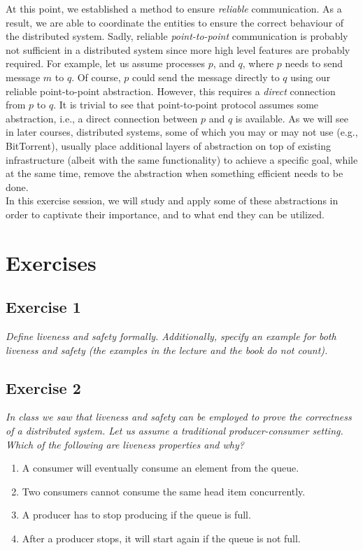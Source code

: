 At this point, we established a method to ensure \emph{reliable} communication. As a result, we are able to coordinate the entities to ensure the correct behaviour of the distributed system. Sadly, reliable \emph{point-to-point} communication is probably not sufficient in a distributed system since more high level features are probably required. For example, let us assume processes $p$, and $q$, where $p$ needs to send message $m$ to $q$. Of course, $p$ could send the message directly to $q$ using our reliable point-to-point abstraction. However, this requires a \emph{direct} connection from $p$ to $q$. It is trivial to see that point-to-point protocol assumes some abstraction, i.e., a direct connection between $p$ and $q$ is available. As we will see in later courses, distributed systems, some of which you may or may not use (e.g., BitTorrent), usually place additional layers of abstraction on top of existing infrastructure (albeit with the same functionality) to achieve a specific goal, while at the same time, remove the abstraction when something efficient needs to be done.\\

In this exercise session, we will study and apply some of these abstractions in order to captivate their importance, and to what end they can be utilized.

\section{Exercises}
\label{sec:exercises}

\subsection*{Exercise 1}
\label{sec:exercise_1}

\emph{Define liveness and safety formally. Additionally, specify an example for both liveness and safety (the examples in the lecture and the book do not count).}

\subsection*{Exercise 2}
\label{sec:exercise_2}

\emph{In class we saw that liveness and safety can be employed to prove the correctness of a distributed system. Let us assume a traditional producer-consumer setting. Which of the following are liveness properties and why?}

\begin{enumerate}
\item A consumer will eventually consume an element from the queue.
\item Two consumers cannot consume the same head item concurrently.
\item A producer has to stop producing if the queue is full.
\item After a producer stops, it will start again if the queue is not full.
\end{enumerate}


